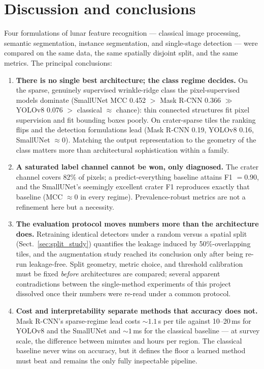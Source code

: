\section{Discussion and conclusions}
\label{sec:conclusions_global}

Four formulations of lunar feature recognition --- classical image processing, semantic segmentation, instance segmentation, and single-stage detection --- were compared on the same data, the same spatially disjoint split, and the same metrics. The principal conclusions:

\begin{enumerate}
    \item \textbf{There is no single best architecture; the class regime decides.} On the sparse, genuinely supervised wrinkle-ridge class the pixel-supervised models dominate (SmallUNet MCC 0.452 $>$ Mask R-CNN 0.366 $\gg$ YOLOv8 0.076 $>$ classical $\approx$ chance): thin connected structures fit pixel supervision and fit bounding boxes poorly. On crater-sparse tiles the ranking flips and the detection formulations lead (Mask R-CNN 0.19, YOLOv8 0.16, SmallUNet $\approx0$). Matching the output representation to the geometry of the class matters more than architectural sophistication within a family.

    \item \textbf{A saturated label channel cannot be won, only diagnosed.} The crater channel covers 82\% of pixels; a predict-everything baseline attains F1 $=0.90$, and the SmallUNet's seemingly excellent crater F1 reproduces exactly that baseline (MCC $\approx0$ in every regime). Prevalence-robust metrics are not a refinement here but a necessity.

    \item \textbf{The evaluation protocol moves numbers more than the architecture does.} Retraining identical detectors under a random versus a spatial split (Sect.~\ref{sec:split_study}) quantifies the leakage induced by 50\%-overlapping tiles, and the augmentation study reached its conclusion only after being re-run leakage-free. Split geometry, metric choice, and threshold calibration must be fixed \emph{before} architectures are compared; several apparent contradictions between the single-method experiments of this project dissolved once their numbers were re-read under a common protocol.

    \item \textbf{Cost and interpretability separate methods that accuracy does not.} Mask R-CNN's sparse-regime lead costs ${\sim}1.1$\,s per tile against 10--20\,ms for YOLOv8 and the SmallUNet and ${\sim}1$\,ms for the classical baseline --- at survey scale, the difference between minutes and hours per region. The classical baseline never wins on accuracy, but it defines the floor a learned method must beat and remains the only fully inspectable pipeline.


\end{enumerate}
